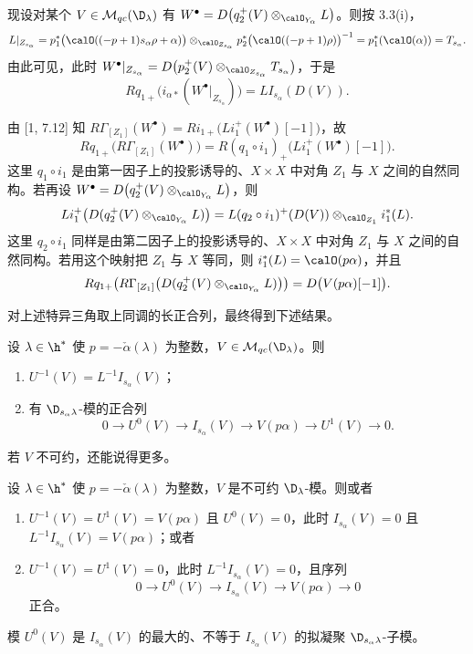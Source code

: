 现设对某个 $V\in\mathcal{M}_{qc}(\D_\lambda)$ 有 $W^\bullet=D\bigl(q_2^+(V)\otimes_{\calO_{Y_\alpha}}L\bigr)$。则按 3.3(i)，
$$L|_{Z_{s_\alpha}}=p_1^*\bigl(\calO((-p+1)s_\alpha\rho+\alpha)\bigr)\otimes_{\calO_{Z_{s_\alpha}}}p_2^*\bigl(\calO((-p+1)\rho)\bigr)^{-1}=p_1^*(\calO(\alpha))=T_{s_\alpha}.$$
由此可见，此时 $W^\bullet|_{Z_{s_\alpha}}=D\bigl(p_2^+(V)\otimes_{\calO_{Z_{s_\alpha}}}T_{s_\alpha}\bigr)$，于是
$$Rq_{1+}\bigl(i_{\alpha*}(W^\bullet|_{Z_{s_\alpha}})\bigr)=LI_{s_\alpha}(D(V)).$$

由 [1, 7.12] 知 $R\Gamma_{[Z_1]}(W^\bullet)=Ri_{1+}\bigl(Li_1^+(W^\bullet)[-1]\bigr)$，故
$$Rq_{1+}\bigl(R\Gamma_{[Z_1]}(W^\bullet)\bigr)=R(q_1\circ i_1)_+\bigl(Li_1^+(W^\bullet)[-1]\bigr).$$
这里 $q_1\circ i_1$ 是由第一因子上的投影诱导的、$X\times X$ 中对角 $Z_1$ 与 $X$ 之间的自然同构。若再设 $W^\bullet=D\bigl(q_2^+(V)\otimes_{\calO_{Y_\alpha}}L\bigr)$，则
$$Li_1^+\bigl(D(q_2^+(V)\otimes_{\calO_{Y_\alpha}}L)\bigr)=L(q_2\circ i_1)^+(D(V))\otimes_{\calO_{Z_1}}i_1^*(L).$$
这里 $q_2\circ i_1$ 同样是由第二因子上的投影诱导的、$X\times X$ 中对角 $Z_1$ 与 $X$ 之间的自然同构。若用这个映射把 $Z_1$ 与 $X$ 等同，则 $i_1^*(L)=\calO(p\alpha)$，并且
$$Rq_{1+}\bigl(R\Gamma_{[Z_1]}\bigl(D(q_2^+(V)\otimes_{\calO_{Y_\alpha}}L)\bigr)\bigr)=D\bigl(V(p\alpha)[-1]\bigr).$$

对上述特异三角取上同调的长正合列，最终得到下述结果。

\begin{theorem}\label{thm:03.8.3}
设 $\lambda\in\h^*$ 使 $p=-\check\alpha(\lambda)$ 为整数，$V\in\mathcal{M}_{qc}(\D_\lambda)$。则
\begin{enumerate}[label=(\roman*),leftmargin=2.6em,itemsep=0.1em]
\item $U^{-1}(V)=L^{-1}I_{s_\alpha}(V)$；
\item 有 $\D_{s_\alpha\lambda}$-模的正合列
$$0\longrightarrow U^0(V)\longrightarrow I_{s_\alpha}(V)\longrightarrow V(p\alpha)\longrightarrow U^1(V)\longrightarrow0.$$
\end{enumerate}
\end{theorem}

若 $V$ 不可约，还能说得更多。

\begin{theorem}\label{thm:03.8.4}
设 $\lambda\in\h^*$ 使 $p=-\check\alpha(\lambda)$ 为整数，$V$ 是不可约 $\D_\lambda$-模。则或者
\begin{enumerate}[label=(\roman*),leftmargin=2.6em,itemsep=0.1em]
\item $U^{-1}(V)=U^1(V)=V(p\alpha)$ 且 $U^0(V)=0$，此时 $I_{s_\alpha}(V)=0$ 且 $L^{-1}I_{s_\alpha}(V)=V(p\alpha)$；或者
\item $U^{-1}(V)=U^1(V)=0$，此时 $L^{-1}I_{s_\alpha}(V)=0$，且序列
$$0\longrightarrow U^0(V)\longrightarrow I_{s_\alpha}(V)\longrightarrow V(p\alpha)\longrightarrow0$$
正合。
\end{enumerate}
模 $U^0(V)$ 是 $I_{s_\alpha}(V)$ 的最大的、不等于 $I_{s_\alpha}(V)$ 的拟凝聚 $\D_{s_\alpha\lambda}$-子模。
\end{theorem}

